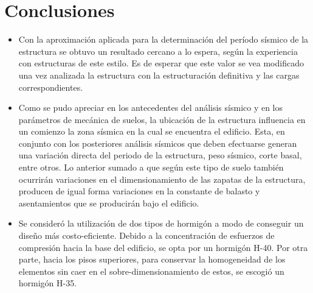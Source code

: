 \newpage
\section{Conclusiones}

\begin{itemize}
    \item Con la aproximación aplicada para la determinación del período sísmico de la estructura se obtuvo un resultado cercano a lo espera, según la experiencia con estructuras de este estilo. Es de esperar que este valor se vea modificado una vez analizada la estructura con la estructuración definitiva y las cargas correspondientes.
    
    \item Como se pudo apreciar en los antecedentes del análisis sísmico y en los parámetros de mecánica de suelos, la ubicación de la estructura influencia en un comienzo la zona sísmica en la cual se encuentra el edificio. Esta, en conjunto con los posteriores análisis sísmicos que deben efectuarse generan una variación directa del periodo de la estructura, peso sísmico, corte basal, entre otros. Lo anterior sumado a que según este tipo de suelo también ocurrirán variaciones en el dimensionamiento de las zapatas de la estructura, producen de igual forma variaciones en la constante de balasto y asentamientos que se producirán bajo el edificio.
    
    \item Se consideró la utilización de dos tipos de hormigón a modo de conseguir un diseño más costo-eficiente. Debido a la concentración de esfuerzos de compresión hacia la base del edificio, se opta por un hormigón H-40. Por otra parte, hacia los pisos superiores, para conservar la homogeneidad de los elementos sin caer en el sobre-dimensionamiento de estos, se escogió un hormigón H-35.
    
\end{itemize}